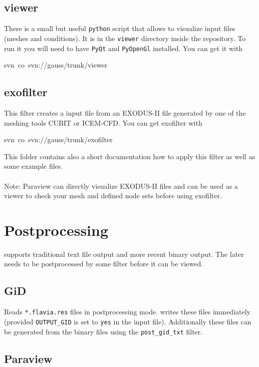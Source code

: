 \subsection{viewer}

There is a small but useful \texttt{python} script that allows to
visualize \ccarat{} input files (meshes and conditions). It is in
the \texttt{viewer} directory inside the repository. To run it you
will need to have \texttt{PyQt} and \texttt{PyOpenGl} installed. You
can get it with

\begin{lyxcode}
svn~co~svn://gauss/trunk/viewer
\end{lyxcode}

\subsection{exofilter}
This filter creates a \baci{} input file from an EXODUS-II file
generated by one of the meshing tools CUBIT or ICEM-CFD.
You can get exofilter with
\begin{lyxcode}
svn~co~svn://gauss/trunk/exofilter
\end{lyxcode}
This folder contains also a short documentation how to apply this filter
as well as some example files.\\
\\
Note: Paraview can directly visualize EXODUS-II files and can be used
as a viewer to check your mesh and defined node sets before using exofilter.


\section{Postprocessing}

\ccarat{} supports traditional text file output and more recent binary
output. The later needs to be postprocessed by some filter before
it can be viewed.


\subsection{GiD}

Reads \texttt{{*}.flavia.res} files in postprocessing mode. \ccarat{}
writes these files immediately (provided \texttt{OUTPUT\_GID} is set
to \texttt{yes} in the input file). Additionally these files can be
generated from the binary files using the \texttt{post\_gid\_txt}
filter.


\subsection{Paraview}

